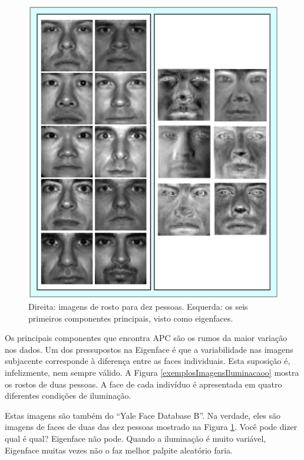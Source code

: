 	\begin{figure}[hbt]
		\begin{center}
			\includegraphics[width=12cm]{figuras/2.FundamentacaoTeorica/eigenfaces.png}
		\end{center}
		\caption{Direita: imagens de rosto para dez pessoas. Esquerda: os seis primeiros componentes principais, visto como eigenfaces.}
		\label{exemploEigenfaces}
	\end{figure}

Os principais componentes que encontra APC são os rumos da maior variação nos dados. Um dos pressupostos na Eigenface é que a variabilidade nas imagens subjacente corresponde à diferença entre as faces individuais. Esta suposição é, infelizmente, nem sempre válido. A Figura \ref{exemplosImagensIluminacaoo} mostra os rostos de duas pessoas. A face de cada indivíduo é apresentada em quatro diferentes condições de iluminação.

Estas imagens são também do ``Yale Face Database B''. Na verdade, eles são imagens de faces de duas das dez pessoas mostrado na Figura \ref{exemploEigenfaces}. Você pode dizer qual é qual? Eigenface não pode. Quando a iluminação é muito variável, Eigenface muitas vezes não o faz melhor palpite aleatório faria.

